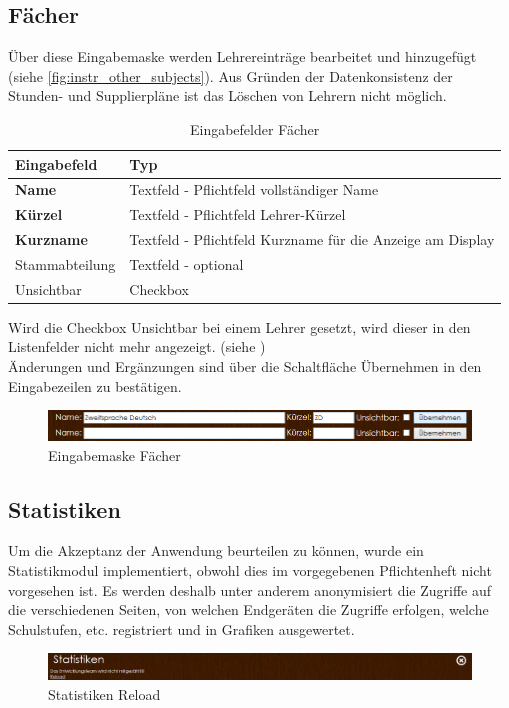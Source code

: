 \subsection{Fächer}
Über diese Eingabemaske werden Lehrereinträge bearbeitet und hinzugefügt (siehe \autoref{fig:instr_other_subjects}). Aus Gründen der Datenkonsistenz der Stunden- und Supplierpläne ist das Löschen von Lehrern nicht möglich.
\begin{table}[H]
\centering
\begin{tabular}{p{3 cm}p{10 cm}}
   \toprule
   \textbf{Eingabefeld} & \textbf{Typ} \\
   \midrule
          \textbf{Name} & Textfeld - Pflichtfeld \newline vollständiger Name \\
          \hline
          \textbf{Kürzel} & Textfeld - Pflichtfeld \newline Lehrer-Kürzel \\
          \hline
          \textbf{Kurzname} & Textfeld - Pflichtfeld \newline Kurzname für die Anzeige am Display \\
          \hline
          Stammabteilung & Textfeld - optional \\
          \hline
          Unsichtbar & Checkbox \\
   \bottomrule
\end{tabular}
\caption{Eingabefelder Fächer}
\end{table}
Wird die Checkbox Unsichtbar bei einem Lehrer gesetzt, wird dieser in den Listenfelder nicht mehr angezeigt. (siehe )\\
Änderungen und Ergänzungen sind über die Schaltfläche Übernehmen in den Eingabezeilen zu bestätigen.
\begin{figure}[H]
\centering
\includegraphics[keepaspectratio=true, width=17cm]{images/screenshots/subjects_input.png}
\caption{Eingabemaske Fächer}
\label{fig:instr_other_subjects}
\end{figure}
\subsection{Statistiken}
Um die Akzeptanz der Anwendung beurteilen zu können, wurde ein Statistikmodul implementiert, obwohl dies im vorgegebenen Pflichtenheft nicht vorgesehen ist. Es werden deshalb unter anderem anonymisiert die Zugriffe auf die verschiedenen Seiten, von welchen Endgeräten die Zugriffe erfolgen, welche Schulstufen, etc. registriert und in Grafiken ausgewertet.
\begin{figure}[H]
\centering
\includegraphics[keepaspectratio=true, width=17cm]{images/screenshots/statistics_header.png}
\caption{Statistiken Reload}
\label{fig:instr_other_statistics_header}
\end{figure}
